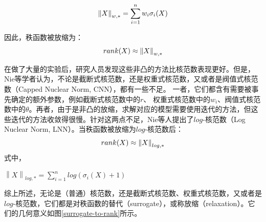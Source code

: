 \documentclass[12pt, a4paper]{article}
\begin{document}
\begin{displaymath}
\centering
\left\|X\right\|_{w,*} = \sum\limits_{i=1}^{n}w_i\sigma_i(X)
\end{displaymath}
\par 因此，秩函数被放缩为：
\begin{equation}
\centering
rank(X) \approx \left\|X\right\|_{w,*}
\label{WNN-equation}
\end{equation}
\par 在做了大量的实验后，研究人员发现这些非凸的方法比核范数表现更好。但是，Nie等学者认为，不论是截断式核范数，还是权重式核范数，又或者是阀值式核范数（Capped Nuclear Norm, CNN）\cite{CNN-1}\cite{CNN-2}，都有一些不足\cite{log-norm}。 一者，它们都含有需要被事先确定的额外参数，例如截断式核范数中的$r$、 权重式核范数中的$w_i$、阀值式核范数中的$\theta$。再者，由于是非凸的放缩，求解对应的模型需要使用迭代的方法，但这些迭代的方法收敛得很慢。针对这两点不足，Nie等人提出了$log$-核范数（Log Nuclear Norm, LNN）。当秩函数被放缩为$log$-核范数后：
\begin{equation}
\centering
rank(X) \approx \left\|X\right\|_{log,*}
\label{log-equation}
\end{equation}
式中，
\par $\left\|X\right\|_{log,*} = \sum\limits_{i=1}^{n}log(\sigma_i(X)+1)$
\par 综上所述，无论是（普通）核范数，还是截断式核范数、权重式核范数，又或者是$log$-核范数，它们都是对秩函数的替代（surrogate），或称放缩（relaxation）。它们的几何意义如图\ref{surrogate-to-rank}所示。
\end{document}
